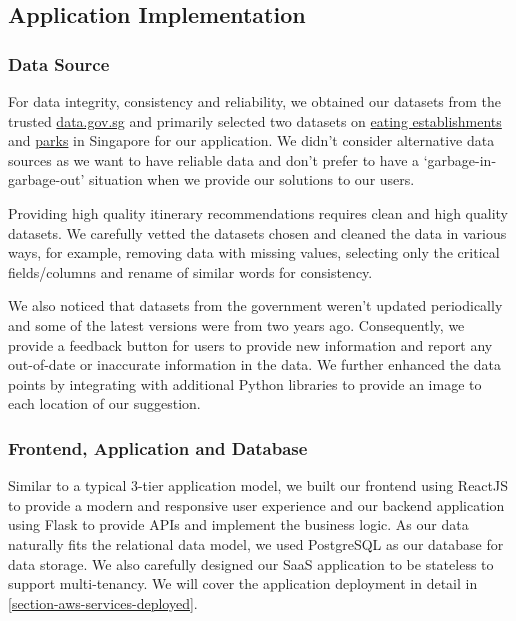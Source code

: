 \documentclass[a4paper]{article}
\begin{document}
    \subsection{Application Implementation}
        \subsubsection{Data Source}
        
        For data integrity, consistency and reliability, we obtained our datasets from the trusted \url{data.gov.sg} and primarily selected two datasets on \href{https://data.gov.sg/dataset/eating-establishments}{eating establishments} and \href{https://data.gov.sg/dataset/parks}{parks} in Singapore for our application. We didn’t consider alternative data sources as we want to have reliable data and don’t prefer to have a ‘garbage-in-garbage-out’ situation when we provide our solutions to our users.

        Providing high quality itinerary recommendations requires clean and high quality datasets. We carefully vetted the datasets chosen and cleaned the data in various ways, for example, removing data with missing values, selecting only the critical fields/columns and rename of similar words for consistency.
        
        We also noticed that datasets from the government weren’t updated periodically and some of the latest versions were from two years ago. Consequently, we provide a feedback button for users to provide new information and report any out-of-date or inaccurate information in the data. We further enhanced the data points by integrating with additional Python libraries to provide an image to each location of our suggestion.

        
        \subsubsection{Frontend, Application and Database}
        
        Similar to a typical 3-tier application model, we built our frontend using ReactJS to provide a modern and responsive user experience and our backend application using Flask to provide APIs and implement the business logic. As our data naturally fits the relational data model, we used PostgreSQL as our database for data storage. We also carefully designed our SaaS application to be stateless to support multi-tenancy. We will cover the application deployment in detail in \autoref{section-aws-services-deployed}.
\end{document}
